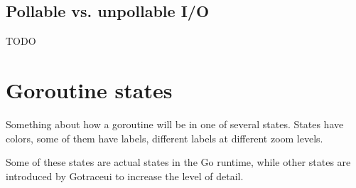 \documentclass[10pt,letterpaper,oneside,openany,showtrims]{memoir}
\newcommand{\todo}[1]{{\color{red}#1}}
\begin{document}
\subsection{Pollable vs. unpollable I/O}\label{netpoller}
\todo{TODO}

\section{Goroutine states}\label{goroutine-states}
\todo{
  Something about how a goroutine will be in one of several states.
  States have colors, some of them have labels, different labels at different zoom levels.
}

Some of these states are actual states in the Go runtime, while other states are introduced by Gotraceui to increase
the level of detail.
\end{document}

